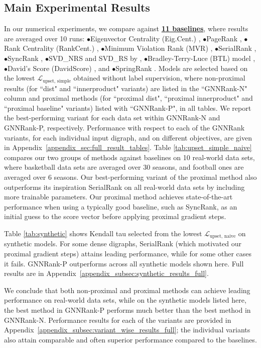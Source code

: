 \documentclass[nohyperref]{article}
\theoremstyle{plain}
\theoremstyle{definition}
\theoremstyle{remark}
\newcommand{\bb}{\hspace{-1mm} $\bullet$}
\begin{document}
\subsection{Main Experimental Results} 
In our numerical experiments, we compare against \underline{\textbf{11 baselines}}, where results are averaged over 10 runs: 
\bb Eigenvector Centrality (Eig.Cent.) \cite{bonacich1987power},  
\bb PageRank \cite{Pageetal98},  
\bb Rank Centrality (RankCent.) \cite{negahban2017rank},  
\bb Minimum Violation Rank (MVR) \cite{MVR_1986}, 
\bb SerialRank \cite{fogel2014SerialRank}, 
\bb SyncRank \cite{cucuringu2016sync}, 
\bb SVD\_NRS and SVD\_RS by \cite{d2021ranking}, 
\bb Bradley-Terry-Luce (BTL) model \cite{firth2005bradley}, 
\bb David's Score (DavidScore) \cite{david1987ranking}, and 
\bb SpringRank \cite{de2018physical}. Models are selected based on the lowest $\mathcal{L}_\text{upset, simple}$ obtained without label supervision, where non-proximal results (for ``dist" and ``innerproduct" variants) are listed in the ``GNNRank-N" column and proximal methods (for ``proximal dist", ``proximal innerproduct" and ``proximal baseline" variants) listed with ``GNNRank-P", in all tables. We report the best-performing variant for each data set within GNNRank-N and GNNRank-P, respectively.  
Performance with respect to each of the GNNRank variants, for each individual input digraph, and on different objectives, are given in Appendix~\ref{appendix_sec:full_result_tables}.
Table \ref{tab:upset_simple_naive} compares our two groups of methods 
against baselines on 10 real-world data sets, where basketball data sets are averaged over 30 seasons, and football ones are averaged over 6 seasons.  
Our best-performing variant of the  proximal method also outperforms  its inspiration
SerialRank \cite{fogel2014SerialRank} on all real-world data sets by including more trainable parameters. Our proximal method achieves state-of-the-art performance when using a typically good baseline, such as SyncRank, as an initial guess to the score vector before applying proximal gradient steps.  


Table \ref{tab:synthetic} shows
Kendall tau 
selected from the lowest 
$\mathcal{L}_\text{upset, naive}$ on synthetic models. For some dense digraphs, SerialRank (which motivated our proximal gradient steps) attains leading performance, while for some other cases it fails. GNNRank-P outperforms across all synthetic models shown here. Full results are in Appendix~\ref{appendix_subsec:synthetic_results_full}.

We conclude that both non-proximal and proximal methods can achieve leading performance on real-world data sets, while on the synthetic models listed here, the best method in GNNRank-P performs much better than the best method
in GNNRank-N. Performance results for
each of the variants are provided in Appendix~\ref{appendix_subsec:variant_wise_results_full}; 
the individual variants also attain comparable and often superior performance compared to the  baselines.
\end{document}
